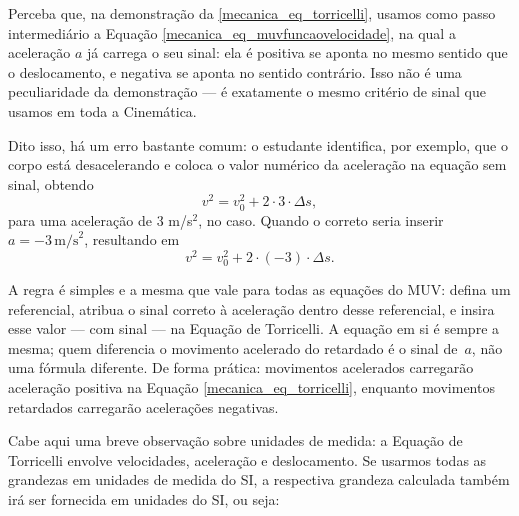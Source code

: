 \begin{itemize}


Perceba que, na demonstração da \eqref{mecanica_eq_torricelli}, usamos como passo intermediário
a Equação \eqref{mecanica_eq_muvfuncaovelocidade}, na qual a aceleração $a$ já carrega o seu sinal: ela é positiva
se aponta no mesmo sentido que o deslocamento, e negativa se aponta no sentido
contrário. Isso não é uma peculiaridade da demonstração --- é exatamente o mesmo
critério de sinal que usamos em toda a Cinemática.

Dito isso, há um erro bastante comum: o estudante identifica, por exemplo, que o
corpo está desacelerando e coloca o valor numérico da aceleração na equação sem sinal, obtendo
%
\begin{equation*}
    v^2 = v_0^2 + 2 \cdot 3 \cdot \Delta s,
\end{equation*}
%
\noindent para uma aceleração de $3$ m/s$^2$, no caso. Quando o correto seria inserir $a = -3\,\text{m/s}^2$, resultando em
%
\begin{equation*}
    v^2 = v_0^2 + 2\cdot(-3)\cdot\Delta s .
\end{equation*}

A regra é simples e a mesma que vale para todas as equações do MUV: defina
um referencial, atribua o sinal correto à aceleração dentro desse referencial, e
insira esse valor --- com sinal --- na Equação de Torricelli. A equação em si é sempre
a mesma; quem diferencia o movimento acelerado do retardado é o sinal de~$a$,
não uma fórmula diferente. De forma prática: movimentos acelerados carregarão aceleração positiva na Equação \eqref{mecanica_eq_torricelli}, enquanto movimentos retardados carregarão acelerações negativas.
    


    
\end{itemize}



Cabe aqui uma breve observação sobre unidades de medida: a Equação de Torricelli envolve velocidades, aceleração e deslocamento. Se usarmos todas as grandezas em unidades de medida do SI, a respectiva grandeza calculada também irá ser fornecida em unidades do SI, ou seja:

